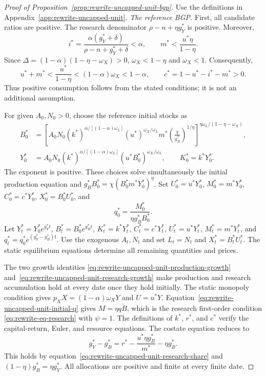 \begin{proof}[Proof of Proposition~\ref{prop:rewrite-uncapped-unit-bgp}]
\label{proof:rewrite-uncapped-unit-bgp}
Use the definitions in Appendix~\ref{app:rewrite-uncapped-unit}.
\textit{The reference BGP.}
First, all candidate ratios are positive. The research denominator
$\rho-n+\eta g_Y^*$ is positive. Moreover,
\[
 i^*=\frac{\alpha(g_Y^*+\delta)}{\rho-n+g_Y^*+\delta}<\alpha,
 \qquad
 m^*<\frac{u^*\eta}{1-\eta}.
\]
Since $\Delta=(1-\alpha)(1-\eta-\omega_X)>0$,
$\omega_X<1-\eta$ and $\omega_X<1$. Consequently,
\[
 u^*+m^*<\frac{u^*}{1-\eta}<(1-\alpha)\omega_X<1-\alpha,
 \qquad c^*=1-u^*-i^*-m^*>0.
\]
Thus positive consumption follows from the stated conditions; it is not
an additional assumption.

For given $A_0,N_0>0$, choose the reference initial stocks as
\begin{align}
 B_0^*&=\left[
 A_0N_0(k^*)^{\alpha/[(1-\alpha)\omega_L]}(u^*)^{\omega_X/\omega_L}
 m^*\left(\frac{\chi}{g_B^*}\right)^{1/\eta}
 \right]^{\eta\omega_L/(1-\eta-\omega_X)},
 \label{eq:rewrite-uncapped-unit-initial-b}\\
 Y_0^*&=A_0N_0(k^*)^{\alpha/[(1-\alpha)\omega_L]}
 (u^*B_0^*)^{\omega_X/\omega_L},
 \qquad K_0^*=k^*Y_0^*.
 \label{eq:rewrite-uncapped-unit-initial-y-k}
\end{align}
The exponent is positive. These choices solve simultaneously the initial
production equation and
$g_B^*B_0^*=\chi(B_0^*m^*Y_0^*)^\eta$.
Set $U_0^*=u^*Y_0^*$, $M_0^*=m^*Y_0^*$, $C_0^*=c^*Y_0^*$,
$X_0^*=B_0^*U_0^*$, and
\begin{equation}
 q_0^*=\frac{M_0^*}{\eta g_B^*B_0^*}.
 \label{eq:rewrite-uncapped-unit-initial-q}
\end{equation}
Let $Y_t^*=Y_0^*e^{g_Y^*t}$, $B_t^*=B_0^*e^{g_B^*t}$,
$K_t^*=k^*Y_t^*$, $C_t^*=c^*Y_t^*$, $U_t^*=u^*Y_t^*$,
$M_t^*=m^*Y_t^*$, and $q_t^*=q_0^*e^{(g_Y^*-g_B^*)t}$.
Use the exogenous $A_t,N_t$ and set $L_t=N_t$ and $X_t^*=B_t^*U_t^*$.
The static equilibrium equations determine all remaining quantities and prices.

The two growth identities
\eqref{eq:rewrite-uncapped-unit-production-growth}
and~\eqref{eq:rewrite-uncapped-unit-research-growth} make production and
research accumulation hold at every date once they hold initially.
The static monopoly condition gives $p_XX=(1-\alpha)\omega_XY$ and $U=u^*Y$.
Equation~\eqref{eq:rewrite-uncapped-unit-initial-q} gives
$M=\eta q\dot B$, which is the research first-order condition
\eqref{eq:rewrite-eq-research} with $\psi=1$.
The definitions of $k^*$, $r^*$, and $c^*$ verify the capital-return,
Euler, and resource equations. The costate equation reduces to
\[
 g_Y^*-g_B^*
 =r^*-\frac{u^*\eta g_B^*}{m^*}-\eta g_B^*.
\]
This holds by equation~\eqref{eq:rewrite-uncapped-unit-research-share}
and $(1-\eta)g_B^*=\eta g_Y^*$.
All allocations are positive and finite at every finite date.


\end{proof}
